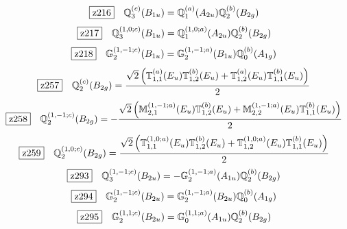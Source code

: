\documentclass[fleqn,10pt,landscape]{jsarticle}
\begin{document}
\begin{dmath*}
\hspace*{3mm}\fbox{z216}\quad \mathbb{Q}_{3}^{(c)}(B_{1u})=\mathbb{Q}_{1}^{(a)}(A_{2u}) \mathbb{Q}_{2}^{(b)}(B_{2g})
\end{dmath*}
\begin{dmath*}
\hspace*{3mm}\fbox{z217}\quad \mathbb{Q}_{3}^{(1,0;c)}(B_{1u})=\mathbb{Q}_{1}^{(1,0;a)}(A_{2u}) \mathbb{Q}_{2}^{(b)}(B_{2g})
\end{dmath*}
\begin{dmath*}
\hspace*{3mm}\fbox{z218}\quad \mathbb{G}_{2}^{(1,-1;c)}(B_{1u})=\mathbb{G}_{2}^{(1,-1;a)}(B_{1u}) \mathbb{Q}_{0}^{(b)}(A_{1g})
\end{dmath*}
\begin{dmath*}
\hspace*{3mm}\fbox{z257}\quad \mathbb{Q}_{2}^{(c)}(B_{2g})=\frac{\sqrt{2} \left(\mathbb{T}_{1,1}^{(a)}(E_{u}) \mathbb{T}_{1,2}^{(b)}(E_{u}) + \mathbb{T}_{1,2}^{(a)}(E_{u}) \mathbb{T}_{1,1}^{(b)}(E_{u})\right)}{2}
\end{dmath*}
\begin{dmath*}
\hspace*{3mm}\fbox{z258}\quad \mathbb{Q}_{2}^{(1,-1;c)}(B_{2g})=- \frac{\sqrt{2} \left(\mathbb{M}_{2,1}^{(1,-1;a)}(E_{u}) \mathbb{T}_{1,2}^{(b)}(E_{u}) + \mathbb{M}_{2,2}^{(1,-1;a)}(E_{u}) \mathbb{T}_{1,1}^{(b)}(E_{u})\right)}{2}
\end{dmath*}
\begin{dmath*}
\hspace*{3mm}\fbox{z259}\quad \mathbb{Q}_{2}^{(1,0;c)}(B_{2g})=\frac{\sqrt{2} \left(\mathbb{T}_{1,1}^{(1,0;a)}(E_{u}) \mathbb{T}_{1,2}^{(b)}(E_{u}) + \mathbb{T}_{1,2}^{(1,0;a)}(E_{u}) \mathbb{T}_{1,1}^{(b)}(E_{u})\right)}{2}
\end{dmath*}
\begin{dmath*}
\hspace*{3mm}\fbox{z293}\quad \mathbb{Q}_{3}^{(1,-1;c)}(B_{2u})=- \mathbb{G}_{2}^{(1,-1;a)}(A_{1u}) \mathbb{Q}_{2}^{(b)}(B_{2g})
\end{dmath*}
\begin{dmath*}
\hspace*{3mm}\fbox{z294}\quad \mathbb{G}_{2}^{(1,-1;c)}(B_{2u})=\mathbb{G}_{2}^{(1,-1;a)}(B_{2u}) \mathbb{Q}_{0}^{(b)}(A_{1g})
\end{dmath*}
\begin{dmath*}
\hspace*{3mm}\fbox{z295}\quad \mathbb{G}_{2}^{(1,1;c)}(B_{2u})=\mathbb{G}_{0}^{(1,1;a)}(A_{1u}) \mathbb{Q}_{2}^{(b)}(B_{2g})
\end{dmath*}
\end{document}

